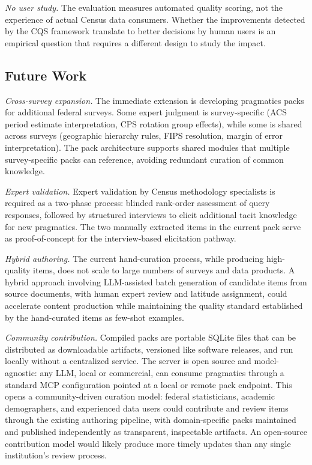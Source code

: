 \documentclass[
  11pt,
  letterpaper,
]{article}
\begin{document}
\emph{No user study.} The evaluation measures automated quality scoring,
not the experience of actual Census data consumers. Whether the
improvements detected by the CQS framework translate to better decisions
by human users is an empirical question that requires a different design
to study the impact.

\subsection{Future Work}\label{future-work}

\emph{Cross-survey expansion.} The immediate extension is developing
pragmatics packs for additional federal surveys. Some expert judgment is
survey-specific (ACS period estimate interpretation, CPS rotation group
effects), while some is shared across surveys (geographic hierarchy
rules, FIPS resolution, margin of error interpretation). The pack
architecture supports shared modules that multiple survey-specific packs
can reference, avoiding redundant curation of common knowledge.

\emph{Expert validation.} Expert validation by Census methodology
specialists is required as a two-phase process: blinded rank-order
assessment of query responses, followed by structured interviews to
elicit additional tacit knowledge for new pragmatics. The two manually
extracted items in the current pack serve as proof-of-concept for the
interview-based elicitation pathway.

\emph{Hybrid authoring.} The current hand-curation process, while
producing high-quality items, does not scale to large numbers of surveys
and data products. A hybrid approach involving LLM-assisted batch
generation of candidate items from source documents, with human expert
review and latitude assignment, could accelerate content production
while maintaining the quality standard established by the hand-curated
items as few-shot examples.

\emph{Community contribution.} Compiled packs are portable SQLite files
that can be distributed as downloadable artifacts, versioned like
software releases, and run locally without a centralized service. The
server is open source and model-agnostic: any LLM, local or commercial,
can consume pragmatics through a standard MCP configuration pointed at a
local or remote pack endpoint. This opens a community-driven curation
model: federal statisticians, academic demographers, and experienced
data users could contribute and review items through the existing
authoring pipeline, with domain-specific packs maintained and published
independently as transparent, inspectable artifacts. An open-source
contribution model would likely produce more timely updates than any
single institution's review process.
\end{document}
